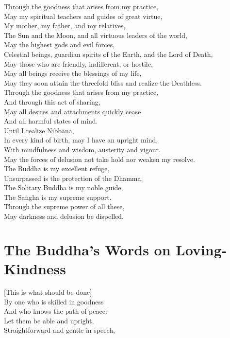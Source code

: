 Through the goodness that arises from my practice,\\
May my spiritual teachers and guides of great virtue,\\
My mother, my father, and my relatives,\\
The Sun and the Moon, and all virtuous leaders of the world,\\
May the highest gods and evil forces,\\
Celestial beings, guardian spirits of the Earth, and the Lord of Death,\\
May those who are friendly, indifferent, or hostile,\\
May all beings receive the blessings of my life,\\
May they soon attain the threefold bliss and realize the Deathless.\\
Through the goodness that arises from my practice,\\
And through this act of sharing,\\
May all desires and attachments quickly cease\\
And all harmful states of mind.\\
Until I realize Nibbāna,\\
In every kind of birth, may I have an upright mind,\\
With mindfulness and wisdom, austerity and vigour.\\
May the forces of delusion not take hold nor weaken my resolve.\\
The Buddha is my excellent refuge,\\
Unsurpassed is the protection of the Dhamma,\\
The Solitary Buddha is my noble guide,\\
The Saṅgha is my supreme support.\\
Through the supreme power of all these,\\
May darkness and delusion be dispelled.

\section{The Buddha's Words on Loving-Kindness}

\begin{leader}
\end{leader}


[This is what should be done]\\
By one who is skilled in goodness\\
And who knows the path of peace:\\
Let them be able and upright,\\
Straightforward and gentle in speech,

